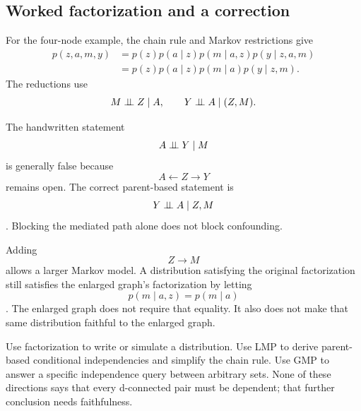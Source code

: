 \subsection{Worked factorization and a correction}
For the four-node example, the chain rule and Markov restrictions give
\begin{align}
p(z,a,m,y)&=p(z)p(a\mid z)p(m\mid a,z)p(y\mid z,a,m)\\
&=p(z)p(a\mid z)p(m\mid a)p(y\mid z,m).
\end{align}
The reductions use
\begin{equation}
M\mathrel{\perp\!\!\!\perp} Z\mid A,\qquad Y\mathrel{\perp\!\!\!\perp} A\mid (Z,M).
\end{equation}
\begin{correction}
The handwritten statement $$A\mathrel{\perp\!\!\!\perp} Y\mid M$$ is generally false because $$A\leftarrow Z\to Y$$ remains open. The correct parent-based statement is $$Y\mathrel{\perp\!\!\!\perp} A\mid Z,M$$. Blocking the mediated path alone does not block confounding.
\end{correction}
Adding $$Z\to M$$ allows a larger Markov model. A distribution satisfying the original factorization still satisfies the enlarged graph's factorization by letting $$p(m\mid a,z)=p(m\mid a)$$. The enlarged graph does not require that equality. It also does not make that same distribution faithful to the enlarged graph.
\begin{remarkbox}
Use factorization to write or simulate a distribution. Use LMP to derive parent-based conditional independencies and simplify the chain rule. Use GMP to answer a specific independence query between arbitrary sets. None of these directions says that every d-connected pair must be dependent; that further conclusion needs faithfulness.
\end{remarkbox}

